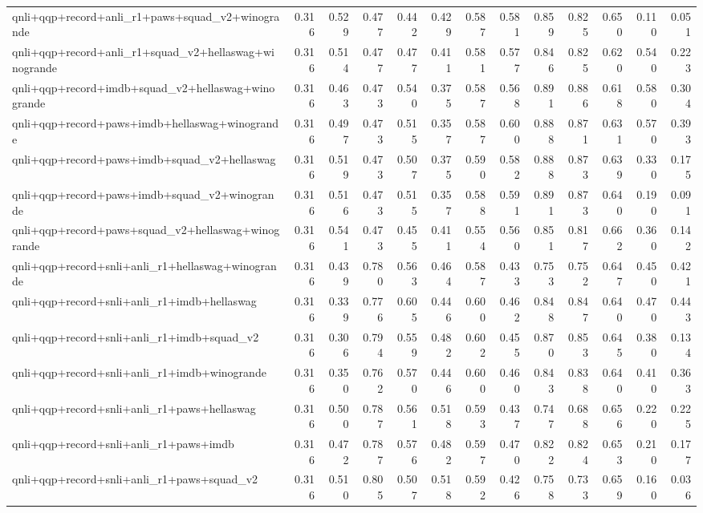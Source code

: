 \begin{table}[t]
\begin{tabular}{lrrrrrrrrrrrr}
    qnli+qqp+record+anli\_r1+paws+squad\_v2+winogrande & 0.316 & 0.529 & 0.477 & 0.442 & 0.429 & 0.587 & 0.581 & 0.859 & 0.825 & 0.650 & 0.110 & 0.051 \\
    qnli+qqp+record+anli\_r1+squad\_v2+hellaswag+winogrande & 0.316 & 0.514 & 0.477 & 0.477 & 0.411 & 0.581 & 0.577 & 0.846 & 0.825 & 0.620 & 0.540 & 0.223 \\
    qnli+qqp+record+imdb+squad\_v2+hellaswag+winogrande & 0.316 & 0.463 & 0.473 & 0.540 & 0.375 & 0.587 & 0.568 & 0.891 & 0.886 & 0.618 & 0.580 & 0.304 \\
    qnli+qqp+record+paws+imdb+hellaswag+winogrande & 0.316 & 0.497 & 0.473 & 0.515 & 0.357 & 0.587 & 0.600 & 0.888 & 0.871 & 0.631 & 0.570 & 0.393 \\
    qnli+qqp+record+paws+imdb+squad\_v2+hellaswag & 0.316 & 0.519 & 0.473 & 0.507 & 0.375 & 0.590 & 0.582 & 0.888 & 0.873 & 0.639 & 0.330 & 0.175 \\
    qnli+qqp+record+paws+imdb+squad\_v2+winogrande & 0.316 & 0.516 & 0.473 & 0.515 & 0.357 & 0.588 & 0.591 & 0.891 & 0.873 & 0.640 & 0.190 & 0.091 \\
    qnli+qqp+record+paws+squad\_v2+hellaswag+winogrande & 0.316 & 0.541 & 0.473 & 0.455 & 0.411 & 0.554 & 0.560 & 0.851 & 0.817 & 0.662 & 0.360 & 0.142 \\
    qnli+qqp+record+snli+anli\_r1+hellaswag+winogrande & 0.316 & 0.439 & 0.780 & 0.563 & 0.464 & 0.587 & 0.433 & 0.753 & 0.752 & 0.647 & 0.450 & 0.421 \\
    qnli+qqp+record+snli+anli\_r1+imdb+hellaswag & 0.316 & 0.339 & 0.776 & 0.605 & 0.446 & 0.600 & 0.462 & 0.848 & 0.847 & 0.640 & 0.470 & 0.443 \\
    qnli+qqp+record+snli+anli\_r1+imdb+squad\_v2 & 0.316 & 0.306 & 0.794 & 0.559 & 0.482 & 0.602 & 0.455 & 0.870 & 0.853 & 0.645 & 0.380 & 0.134 \\
    qnli+qqp+record+snli+anli\_r1+imdb+winogrande & 0.316 & 0.350 & 0.762 & 0.570 & 0.446 & 0.600 & 0.460 & 0.843 & 0.838 & 0.640 & 0.410 & 0.363 \\
    qnli+qqp+record+snli+anli\_r1+paws+hellaswag & 0.316 & 0.500 & 0.787 & 0.561 & 0.518 & 0.593 & 0.437 & 0.747 & 0.688 & 0.656 & 0.220 & 0.225 \\
    qnli+qqp+record+snli+anli\_r1+paws+imdb & 0.316 & 0.472 & 0.787 & 0.576 & 0.482 & 0.597 & 0.470 & 0.822 & 0.824 & 0.653 & 0.210 & 0.177 \\
    qnli+qqp+record+snli+anli\_r1+paws+squad\_v2 & 0.316 & 0.510 & 0.805 & 0.507 & 0.518 & 0.592 & 0.426 & 0.758 & 0.733 & 0.659 & 0.160 & 0.036 \\

\end{tabular}
\end{table}
